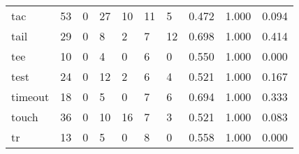 \begin{longtable}{lp{2.0cm}p{2.0cm}p{2.0cm}p{2.0cm}p{2.0cm}p{2.0cm}p{2.0cm}p{2.0cm}p{2.0cm}}
tac       &                     53 &                                             0 &                                           27 &                                          10 &                                           11 &                                          5 &                                0.472 &                                  1.000 &                                0.094 \\
tail      &                     29 &                                             0 &                                            8 &                                           2 &                                            7 &                                         12 &                                0.698 &                                  1.000 &                                0.414 \\
tee       &                     10 &                                             0 &                                            4 &                                           0 &                                            6 &                                          0 &                                0.550 &                                  1.000 &                                0.000 \\
test      &                     24 &                                             0 &                                           12 &                                           2 &                                            6 &                                          4 &                                0.521 &                                  1.000 &                                0.167 \\
timeout   &                     18 &                                             0 &                                            5 &                                           0 &                                            7 &                                          6 &                                0.694 &                                  1.000 &                                0.333 \\
touch     &                     36 &                                             0 &                                           10 &                                          16 &                                            7 &                                          3 &                                0.521 &                                  1.000 &                                0.083 \\
tr        &                     13 &                                             0 &                                            5 &                                           0 &                                            8 &                                          0 &                                0.558 &                                  1.000 &                                0.000 \\

\end{longtable}
